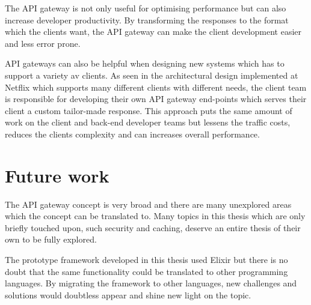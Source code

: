 \documentclass{cslthse-msc}
\begin{document}
The API gateway is not only useful for optimising performance but can also increase developer productivity. By transforming the responses to the format which the clients want, the API gateway can make the client development easier and less error prone. 

API gateways can also be helpful when designing new systems which has to support a variety av clients. As seen in the architectural design implemented at Netflix\cite{netflix} which supports many different clients with different needs, the client team is responsible for developing their own API gateway end-points which serves their client a custom tailor-made response. This approach puts the same amount of work on the client and back-end developer teams but lessens the traffic costs, reduces the clients complexity and can increases overall performance.

\section{Future work}

The API gateway concept is very broad and there are many unexplored areas which the concept can be translated to. Many topics in this thesis which are only briefly touched upon, such security and caching, deserve an entire thesis of their own to be fully explored.

The prototype framework developed in this thesis used Elixir but there is no doubt that the same functionality could be translated to other programming languages. By migrating the framework to other languages, new challenges and solutions would doubtless appear and shine new light on the topic. 

\cleardoublepage
{}
{}


\end{document}

